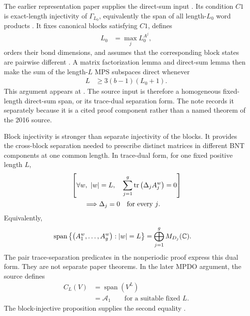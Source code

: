 \documentclass{article}
\begin{document}
The earlier representation paper supplies the direct-sum input
\cite{PerezGarcia2007MPSReps}. Its condition $C1$ is exact-length
injectivity of $\Gamma_{L_0}$, equivalently the span of all length-$L_0$
word products
\cite[lines~888--908]{PerezGarcia2007MPSReps}. It fixes canonical blocks
satisfying $C1$, defines
\begin{align}
    L_0
        &=
        \max_j L_0^{A^j},
    \label{eq:rmp_nonperiodic_bnt_comparison_inputs_common_injectivity_length}
\end{align}
orders their bond dimensions, and assumes that the corresponding block states
are pairwise different
\cite[lines~1321--1330]{PerezGarcia2007MPSReps}. A matrix factorization lemma
and direct-sum lemma then make the sum of the length-$L$ MPS subspaces direct
whenever
\begin{align}
    L
        &\geq
        3(b-1)(L_0+1).
    \label{eq:rmp_nonperiodic_bnt_comparison_inputs_direct_sum_length_bound}
\end{align}
This argument appears at
\cite[lines~1333--1408]{PerezGarcia2007MPSReps}. The source input is therefore
a homogeneous fixed-length direct-sum span, or its trace-dual separation form.
The note
 records it separately
because it is a cited proof component rather than a named theorem of the 2016
source.

Block injectivity is stronger than separate injectivity of the blocks. It
provides the cross-block separation needed to prescribe distinct matrices in
different BNT components at one common length. In trace-dual form, for one
fixed positive length $L$,
\begin{align}
    &\left[\forall w,\ |w|=L,\quad
        \sum_{j=1}^{g}\operatorname{tr}\left(\Delta_jA_j^w\right)=0\right]
    \notag\\
    &\qquad\Longrightarrow
        \Delta_j=0
        \quad\text{for every $j$}.
    \label{eq:rmp_nonperiodic_bnt_comparison_inputs_trace_dual_separation}
\end{align}
Equivalently,
\begin{align}
    \operatorname{span}
        \left\{\left(A_1^w,\ldots,A_g^w\right): |w|=L\right\}
        &=
        \bigoplus_{j=1}^{g}M_{D_j}(\mathbb{C}).
    \label{eq:rmp_nonperiodic_bnt_comparison_inputs_exact_length_direct_sum}
\end{align}
The pair trace-separation predicates in the nonperiodic proof express this dual
form. They are not separate paper theorems. In the later MPDO argument, the
source defines
\begin{align}
    C_L(V)
        &=
        \operatorname{span}(V^L)
    \label{eq:rmp_nonperiodic_bnt_comparison_inputs_source_exact_length_space}\\
        &=
        \mathcal A_1
        \qquad\text{for a suitable fixed $L$}.
    \label{eq:rmp_nonperiodic_bnt_comparison_inputs_source_exact_length_algebra}
\end{align}
The block-injective proposition supplies the second equality
\cite[lines~1984--1988]{Cirac2016MPDO_arXiv}.
\end{document}
